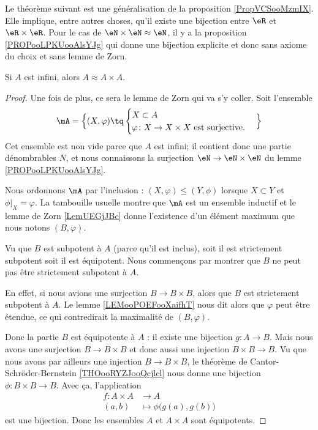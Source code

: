Le théorème suivant est une généralisation de la proposition \ref{PropVCSooMzmIX}. Elle implique, entre autres choses, qu'il existe une bijection entre \( \eR\) et \( \eR\times \eR\). Pour le cas de \( \eN\times \eN\approx \eN\), il y a la proposition \ref{PROPooLPKUooAlsYJg} qui donne une bijection explicite et donc sans axiome du choix et sans lemme de Zorn.
\begin{theorem}     \label{THOooDGOVooRdURVi}
    Si \( A\) est infini, alors \( A\approx A\times A\).
\end{theorem}

\begin{proof}
    Une fois de plus, ce sera le lemme de Zorn qui va s'y coller. Soit l'ensemble
    \begin{equation}
       \mA=\Big\{  (X,\varphi)  \tq
        \begin{cases}
            X\subset A\\
            \varphi\colon X\to X\times X\text{ est surjective.}
        \end{cases}
    \Big\}
    \end{equation}
    Cet ensemble est non vide parce que \( A\) est infini; il contient donc une partie dénombrables \( N\), et nous connaissons la surjection \( \eN\to \eN\times \eN\) du lemme \ref{PROPooLPKUooAlsYJg}.

    Nous ordonnons \( \mA\) par l'inclusion : \( (X,\varphi)\leq (Y,\phi)\) lorsque \( X\subset Y\) et \( \phi|_X=\varphi\). La tambouille usuelle montre que \( \mA\) est un ensemble inductif et le lemme de Zorn \ref{LemUEGjJBc} donne l'existence d'un élément maximum que nous notons \( (B,\varphi)\).

    Vu que \( B\) est subpotent à \( A\) (parce qu'il est inclus), soit il est strictement subpotent soit il est équipotent. Nous commençons par montrer que \( B\) ne peut pas être strictement subpotent à \( A\).

    En effet, si nous avions une surjection \( B\to B\times B\), alors que \( B\) est strictement subpotent à \( A\). Le lemme \ref{LEMooPOEFooXaifhT} nous dit alors que \( \varphi\) peut être étendue, ce qui contredirait la maximalité de \( (B,\varphi)\).

    Donc la partie \( B\) est équipotente à \( A\) : il existe une bijection \( g\colon A\to B\). Mais nous avons une surjection \( B\to B\times B\) et donc aussi une injection \( B\times B\to B\). Vu que nous avons par ailleurs une injection \( B\to B\times B\), le théorème de Cantor-Schröder-Bernstein \ref{THOooRYZJooQcjlcl} nous donne une bijection \( \phi\colon B\times B\to B\). Avec ça, l'application
    \begin{equation}
        \begin{aligned}
            f\colon A\times A&\to A \\
            (a,b)&\mapsto \phi\big( g(a),g(b) \big) 
        \end{aligned}
    \end{equation}
    est une bijection. Donc les ensembles \( A\) et \( A\times A\) sont équipotents.
\end{proof}

